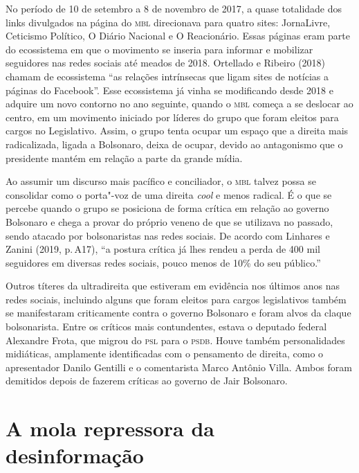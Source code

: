 No período de 10 de setembro a 8 de novembro de 2017, a quase totalidade
dos links divulgados na página do \textsc{mbl} direcionava para quatro sites:
JornaLivre, Ceticismo Político, O Diário Nacional e O Reacionário. Essas
páginas eram parte do ecossistema em que o movimento se inseria para
informar e mobilizar seguidores nas redes sociais até meados de 2018.
Ortellado e Ribeiro (2018) chamam de ecossistema ``as relações
intrínsecas que ligam sites de notícias a páginas do Facebook''. Esse
ecossistema já vinha se modificando desde 2018 e adquire um novo
contorno no ano seguinte, quando o \textsc{mbl} começa a se deslocar ao centro,
em um movimento iniciado por líderes do grupo que foram eleitos para
cargos no Legislativo. Assim, o grupo tenta ocupar um espaço que a
direita mais radicalizada, ligada a Bolsonaro, deixa de ocupar, devido
ao antagonismo que o presidente mantém em relação a parte da grande
mídia.

Ao assumir um discurso mais pacífico e conciliador, o \textsc{mbl} talvez possa
se consolidar como o porta"-voz de uma direita \textit{cool} e menos
radical. É o que se percebe quando o grupo se posiciona de forma crítica
em relação ao governo Bolsonaro e chega a provar do próprio veneno de
que se utilizava no passado, sendo atacado por bolsonaristas nas redes
sociais. De acordo com Linhares e Zanini (2019, p.\,A17), ``a postura
crítica já lhes rendeu a perda de 400 mil seguidores em diversas redes
sociais, pouco menos de 10\% do seu público.''

Outros títeres da ultradireita que estiveram em evidência nos últimos
anos nas redes sociais, incluindo alguns que foram eleitos para cargos
legislativos também se manifestaram criticamente contra o governo
Bolsonaro e foram alvos da claque bolsonarista. Entre os críticos mais
contundentes, estava o deputado federal Alexandre Frota, que migrou do
\textsc{psl} para o \textsc{psdb}. Houve também personalidades midiáticas, amplamente
identificadas com o pensamento de direita, como o apresentador Danilo
Gentilli e o comentarista Marco Antônio Villa. Ambos foram demitidos
depois de fazerem críticas ao governo de Jair Bolsonaro.

\section{A mola repressora da desinformação}

